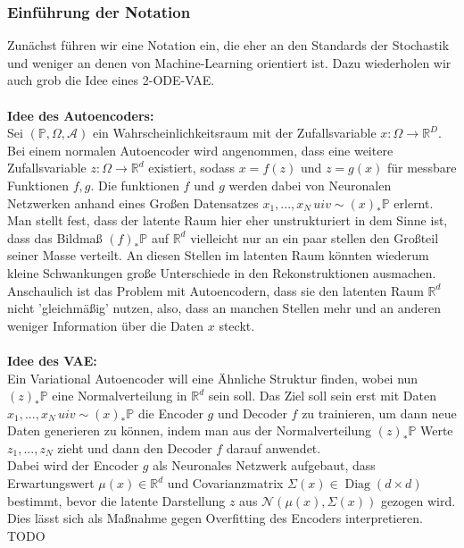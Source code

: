 \documentclass[12pt]{article}
\newcommand{\R}{\mathbb{R}}
\newcommand{\bP}{\mathbb{P}}
\begin{document}
	\newpage
	\subsubsection[Notation]{Einführung der Notation}
	Zunächst führen wir eine Notation ein, die eher an den Standards der Stochastik und weniger an denen von Machine-Learning orientiert ist. Dazu wiederholen wir auch grob die Idee eines 2-ODE-VAE.\\
	\\
	\textbf{Idee des Autoencoders:}\\
	Sei $(\bP,\Omega,\mathcal{A})$ ein Wahrscheinlichkeitsraum mit der Zufallsvariable $x : \Omega \rightarrow \R^D$. Bei einem normalen Autoencoder wird angenommen, dass eine weitere Zufallsvariable $z: \Omega \rightarrow \R^d$ existiert, sodass $x = f(z)$ und $z = g(x)$ für messbare Funktionen $f,g$. Die funktionen $f$ und $g$ werden dabei von Neuronalen Netzwerken anhand eines Großen Datensatzes $x_1,...,x_N \, uiv \sim (x)_*\bP$ erlernt.\\
	Man stellt fest, dass der latente Raum hier eher unstrukturiert in dem Sinne ist, dass das Bildmaß $(f)_*\bP$ auf $\R^d$ vielleicht nur an ein paar stellen den Großteil seiner Masse verteilt. An diesen Stellen im latenten Raum könnten wiederum kleine Schwankungen große Unterschiede in den Rekonstruktionen ausmachen. Anschaulich ist das Problem mit Autoencodern, dass sie den latenten Raum $\R^d$ nicht 'gleichmäßig' nutzen, also, dass an manchen Stellen mehr und an anderen weniger Information über die Daten $x$ steckt.\\
	\\
	\textbf{Idee des VAE:}\\
	Ein Variational Autoencoder will eine Ähnliche Struktur finden, wobei nun $(z)_*\bP$ eine Normalverteilung in $\R^d$ sein soll. Das Ziel soll sein erst mit Daten $x_1,...,x_N \, uiv \sim (x)_*\bP$ die Encoder $g$ und Decoder $f$ zu trainieren, um dann neue Daten generieren zu können, indem man aus der Normalverteilung $(z)_*\bP$ Werte $z_1,...,z_N$ zieht und dann den Decoder $f$ darauf anwendet.\\
	Dabei wird der Encoder $g$ als Neuronales Netzwerk aufgebaut, dass Erwartungswert $\mu(x) \in \R^d$ und Covarianzmatrix $\Sigma(x) \in \operatorname{Diag}(d\times d)$ bestimmt, bevor die latente Darstellung $z$ aus $\mathcal{N}\left(\mu(x),\Sigma(x)\right)$ gezogen wird. Dies lässt sich als Maßnahme gegen Overfitting des Encoders interpretieren. TODO
	
	
	
\end{document}
